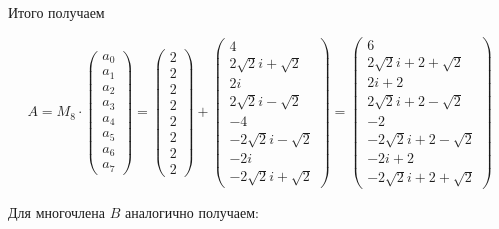 \documentclass[a4paper,12pt]{article}
\begin{document}
\begin{solution}
	Итого получаем
	
	\begin{equation*}
	A = M_8 \cdot \left(
	\begin{array}{c}
	a_0 \\
	a_1 \\
	a_2 \\
	a_3 \\
	a_4 \\
	a_5 \\
	a_6 \\
	a_7
	\end{array}
	\right) = \left(
	\begin{array}{c}
	2 \\
	2 \\
	2 \\
	2 \\
	2 \\
	2 \\
	2 \\
	2
	\end{array}
	\right) + \left(
	\begin{array}{c}
	4 \\
	2\sqrt{2}i + \sqrt{2} \\
	2i \\
	2\sqrt{2}i - \sqrt{2} \\
	-4 \\
	-2\sqrt{2}i - \sqrt{2} \\
	-2i \\
	-2\sqrt{2}i + \sqrt{2}
	\end{array}
	\right) = \left(
	\begin{array}{c}
	6 \\
	2\sqrt{2}i + 2 + \sqrt{2} \\
	2i + 2 \\
	2\sqrt{2}i + 2 - \sqrt{2} \\
	-2 \\
	-2\sqrt{2}i + 2 - \sqrt{2} \\
	-2i + 2 \\
	-2\sqrt{2}i + 2 + \sqrt{2}
	\end{array}
	\right)
	\end{equation*}
	
	Для многочлена $B$ аналогично получаем:
	

\end{solution}
\end{document}
